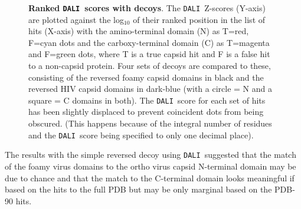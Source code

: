 \documentclass[preprint,12pt]{elsarticle}
\newcommand{\DALI}{{\tt DALI}}
\begin{document}
\begin{figure}
\centering
{}
\begin{footnotesize}
\caption{
\label{Fig:revs}
{\bf Ranked \DALI\ scores with decoys}.
The \DALI\ Z-scores (Y-axis) are plotted against the log$_{10}$ of their ranked position in the
list of hits (X-axis) with the amino-terminal domain (N) as T=red, F=cyan dots and the carboxy-terminal domain (C)
as T=magenta and F=green dots, where T is a true capsid hit and F is a false hit to a non-capsid protein.
Four sets of decoys are compared to these, consisting of the reversed foamy capsid domains in
black and the reversed HIV capsid domains in dark-blue (with a circle = N and a square = C domains in both).
The \DALI\ score for each set of hits has been slightly displaced to prevent coincident dots from being
obscured.  (This happens because of the integral number of residues and the \DALI\ score being specified
to only one decimal place).
}
\end{footnotesize}
\end{figure}

The results with the simple reversed decoy using \DALI\, suggested that the match of the foamy virus domains to the
ortho virus capsid N-terminal domain may be due to chance and that the match to the C-terminal domain looks
meaningful if based on the hits to the full PDB but may be only marginal based on the PDB-90 hits.
\end{document}
